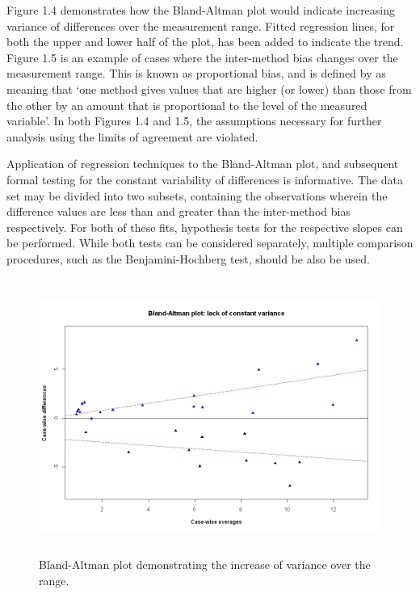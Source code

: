 \documentclass[12pt, a4paper]{report}
\theoremstyle{plain}
\theoremstyle{definition}
\theoremstyle{remark}
\begin{document}
	Figure 1.4 demonstrates how the Bland-Altman plot would indicate
	increasing variance of differences over the measurement range.
	Fitted regression lines, for both the upper and lower half of the
	plot, has been added to indicate the trend. Figure 1.5 is an
	example of cases where the inter-method bias changes over the
	measurement range. This is known as proportional bias, and is
	defined by \citet{ludbrook97} as meaning that `one method gives values that are higher (or lower) than those from the other by an 	amount that is proportional to the level of the measured variable'. In both Figures 1.4 and 1.5, the assumptions necessary
	for further analysis using the limits of agreement are violated.
	
	Application of regression techniques to the Bland-Altman plot, and
	subsequent formal testing for the constant variability of
	differences is informative. The data set may be divided into two
	subsets, containing the observations wherein the difference values
	are less than and greater than the inter-method bias respectively.
	For both of these fits, hypothesis tests for the respective slopes
	can be performed. While both tests can be considered separately,
	multiple comparison procedures, such as the Benjamini-Hochberg
	\citep{BH} test, should be also be used.
	
	\begin{figure}[h!]
		\begin{center}
			\includegraphics[height=90mm]{images/BAFanEffect.jpeg}
			\caption{Bland-Altman plot demonstrating the increase of variance over the range.}\label{BAFanEffect}
		\end{center}
	\end{figure}
	
\end{document}
